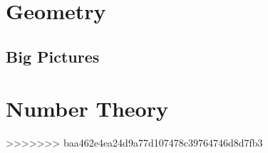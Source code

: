 \documentclass[a4paper, 12pt, oneside]{memoir}
\begin{document}
 \chapter{Geometry}
 \thispagestyle{empty}

 
 
 
 
 
 
 
 
 
 
 
 
 
 
 
 

 \section{Big Pictures}
 


 \chapter{Number Theory}
 \thispagestyle{empty}

 
 
 
 
 
 
 
 


 \printindex[prob]
 \printindex[thm]
 \printindex[def]
 \printindex[strat]
 \printindex
>>>>>>> baa462e4ea24d9a77d107478c39764746d8d7fb3
\end{document}
